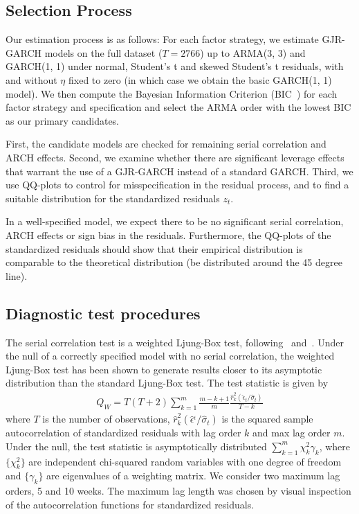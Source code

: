 \subsection{Selection Process} %
\label{sub:selection_process}

Our estimation process is as follows: For each factor strategy, we estimate GJR-GARCH models on the full dataset ($T = 2766$) up to ARMA(3, 3) and GARCH(1, 1) under normal, Student's t and skewed Student's t residuals, with and without $\eta$ fixed to zero (in which case we obtain the basic GARCH(1, 1) model). We then compute the Bayesian Information Criterion (BIC~\autocite{Schwarz1978}) for each factor strategy and specification and select the ARMA order with the lowest BIC as our primary candidates.

First, the candidate models are checked for remaining serial correlation and ARCH effects. Second, we examine whether there are significant leverage effects that warrant the use of a GJR-GARCH instead of a standard GARCH. Third, we use QQ-plots to control for misspecification in the residual process, and to find a suitable distribution for the standardized residuals $z_t$.

In a well-specified model, we expect there to be no significant serial correlation, ARCH effects or sign bias in the residuals. Furthermore, the QQ-plots of the standardized residuals should show that their empirical distribution is comparable to the theoretical distribution (be distributed around the 45 degree line).


\subsection{Diagnostic test procedures}
\label{sub:diagnostic_test_procedures}

The serial correlation test is a weighted Ljung-Box test, following~\textcite{FisherGallagher2012} and~\textcite{LjungBox1978}. Under the null of a correctly specified model with no serial correlation, the weighted Ljung-Box test has been shown to generate results closer to its asymptotic distribution than the standard Ljung-Box test. The test statistic is given by
\begin{align}
	Q_W = T (T+2) \sum\limits^m_{k = 1} \frac{m-k+1}{m} \frac{\hat{r}_{k}^{2} (\hat{\epsilon}_{t} / \hat{\sigma}_{t})}{T-k}
\end{align}
where $T$ is the number of observations, $\hat{r}^{2}_{k} ( \hat{\epsilon}^_{t} / \hat{\sigma}_{t} )$ is the squared sample autocorrelation of standardized residuals with lag order $k$ and max lag order $m$. Under the null, the test statistic is asymptotically distributed $\sum\limits^m_{k = 1} \chi^2_k \gamma_k$, where $\{\chi^2_k\}$ are independent chi-squared random variables with one degree of freedom and $\{\gamma_k\}$ are eigenvalues of a weighting matrix. We consider two maximum lag orders, 5 and 10 weeks. The maximum lag length was chosen by visual inspection of the autocorrelation functions for standardized residuals.


